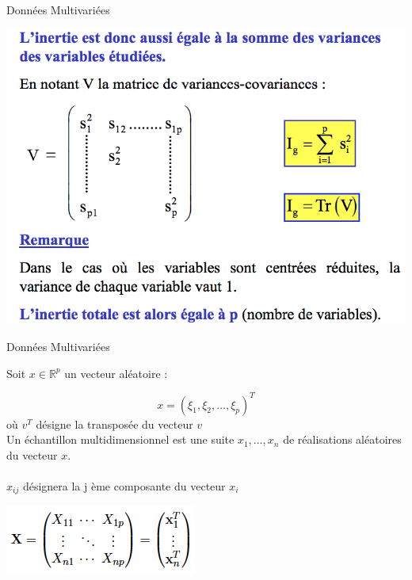 \documentclass[12pt]{beamer}
\begin{document}
\begin{frame}{Données Multivariées}

  
\centering 
 \includegraphics[scale=0.37]{Dist3.png} 
 
\end{frame}




\begin{frame}{Données Multivariées}

 Soit $x \in \mathbb{R}^p$ un vecteur aléatoire :
 
 $$ x=(\xi_1,\xi_2, \ldots, \xi_p )^T$$ où $v^T$ désigne la transposée du vecteur $v$ \\ 
 
 Un échantillon multidimensionnel est une suite $x_1, \ldots, x_n$ de  réalisations aléatoires du vecteur $x$.\\ \  \\
 
 $x_{ij}$ désignera la j ème composante du vecteur $x_i$
 
\centering 
 \includegraphics[scale=0.6]{X.png} 
 

\end{frame}
 
\end{document}
